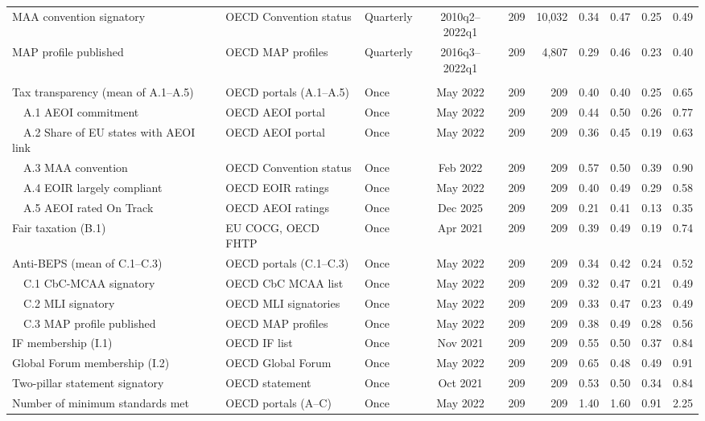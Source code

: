 \begin{table}[ht!]
\begin{adjustbox}{max width=\textwidth}
\begin{tabular}{lllcrrrrrr}
MAA convention signatory & OECD Convention status & Quarterly & 2010q2--2022q1 & 209 & 10,032 & 0.34 & 0.47 & 0.25 & 0.49 \\
MAP profile published & OECD MAP profiles & Quarterly & 2016q3--2022q1 & 209 & 4,807 & 0.29 & 0.46 & 0.23 & 0.40 \\
\addlinespace
\multicolumn{10}{l}{\textbf{E. Tax governance and listing outcomes measured once (all non-EU jurisdictions)}} \\
Tax transparency (mean of A.1--A.5) & OECD portals (A.1--A.5) & Once & May 2022 & 209 & 209 & 0.40 & 0.40 & 0.25 & 0.65 \\
~~A.1 AEOI commitment & OECD AEOI portal & Once & May 2022 & 209 & 209 & 0.44 & 0.50 & 0.26 & 0.77 \\
~~A.2 Share of EU states with AEOI link & OECD AEOI portal & Once & May 2022 & 209 & 209 & 0.36 & 0.45 & 0.19 & 0.63 \\
~~A.3 MAA convention & OECD Convention status & Once & Feb 2022 & 209 & 209 & 0.57 & 0.50 & 0.39 & 0.90 \\
~~A.4 EOIR largely compliant & OECD EOIR ratings & Once & May 2022 & 209 & 209 & 0.40 & 0.49 & 0.29 & 0.58 \\
~~A.5 AEOI rated On Track & OECD AEOI ratings & Once & Dec 2025 & 209 & 209 & 0.21 & 0.41 & 0.13 & 0.35 \\
Fair taxation (B.1) & EU COCG, OECD FHTP & Once & Apr 2021 & 209 & 209 & 0.39 & 0.49 & 0.19 & 0.74 \\
Anti-BEPS (mean of C.1--C.3) & OECD portals (C.1--C.3) & Once & May 2022 & 209 & 209 & 0.34 & 0.42 & 0.24 & 0.52 \\
~~C.1 CbC-MCAA signatory & OECD CbC MCAA list & Once & May 2022 & 209 & 209 & 0.32 & 0.47 & 0.21 & 0.49 \\
~~C.2 MLI signatory & OECD MLI signatories & Once & May 2022 & 209 & 209 & 0.33 & 0.47 & 0.23 & 0.49 \\
~~C.3 MAP profile published & OECD MAP profiles & Once & May 2022 & 209 & 209 & 0.38 & 0.49 & 0.28 & 0.56 \\
IF membership (I.1) & OECD IF list & Once & Nov 2021 & 209 & 209 & 0.55 & 0.50 & 0.37 & 0.84 \\
Global Forum membership (I.2) & OECD Global Forum & Once & May 2022 & 209 & 209 & 0.65 & 0.48 & 0.49 & 0.91 \\
Two-pillar statement signatory & OECD statement & Once & Oct 2021 & 209 & 209 & 0.53 & 0.50 & 0.34 & 0.84 \\
Number of minimum standards met & OECD portals (A--C) & Once & May 2022 & 209 & 209 & 1.40 & 1.60 & 0.91 & 2.25 \\

\end{tabular}
\end{adjustbox}
\end{table}
